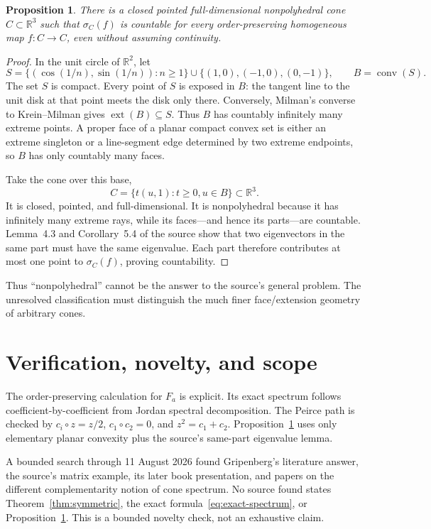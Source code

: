\documentclass[10pt]{article}
\newtheorem{proposition}[theorem]{Proposition}
\newcommand{\R}{\mathbb R}
\begin{document}
\begin{proposition}\label{prop:counter}
There is a closed pointed full-dimensional nonpolyhedral cone $C\subset\R^3$
such that $\sigma_C(f)$ is countable for every order-preserving homogeneous
map $f:C\to C$, even without assuming continuity.
\end{proposition}

\begin{proof}
In the unit circle of $\R^2$, let
\[
 S=\{(\cos(1/n),\sin(1/n)):n\geq1\}
 \cup\{(1,0),(-1,0),(0,-1)\},
 \qquad B=\operatorname{conv}(S).
\]
The set $S$ is compact.  Every point of $S$ is exposed in $B$: the tangent
line to the unit disk at that point meets the disk only there.  Conversely,
Milman's converse to Krein--Milman gives $\operatorname{ext}(B)\subseteq S$.
Thus $B$ has countably infinitely many extreme points.  A proper face of a
planar compact convex set is either an extreme singleton or a line-segment
edge determined by two extreme endpoints, so $B$ has only countably many
faces.

Take the cone over this base,
\[
 C=\{t(u,1):t\geq0, u\in B\}\subset\R^3.
\]
It is closed, pointed, and full-dimensional.  It is nonpolyhedral because it
has infinitely many extreme rays, while its faces---and hence its
parts---are countable.  Lemma~4.3 and Corollary~5.4 of the source show that
two eigenvectors in the same part must have the same eigenvalue.  Each part
therefore contributes at most one point to $\sigma_C(f)$, proving
countability.
\end{proof}

Thus ``nonpolyhedral'' cannot be the answer to the source's general problem.
The unresolved classification must distinguish the much finer face/extension
geometry of arbitrary cones.

\section{Verification, novelty, and scope}

The order-preserving calculation for $F_a$ is explicit.  Its exact spectrum
follows coefficient-by-coefficient from Jordan spectral decomposition.  The
Peirce path is checked by $c_i\circ z=z/2$, $c_1\circ c_2=0$, and
$z^2=c_1+c_2$.  Proposition~\ref{prop:counter} uses only elementary planar
convexity plus the source's same-part eigenvalue lemma.

A bounded search through 11 August 2026 found Gripenberg's literature answer,
the source's matrix example, its later book presentation, and papers on the
different complementarity notion of cone spectrum.  No source found states
Theorem~\ref{thm:symmetric}, the exact formula~\eqref{eq:exact-spectrum}, or
Proposition~\ref{prop:counter}.  This is a bounded novelty check, not an
exhaustive claim.
\end{document}
